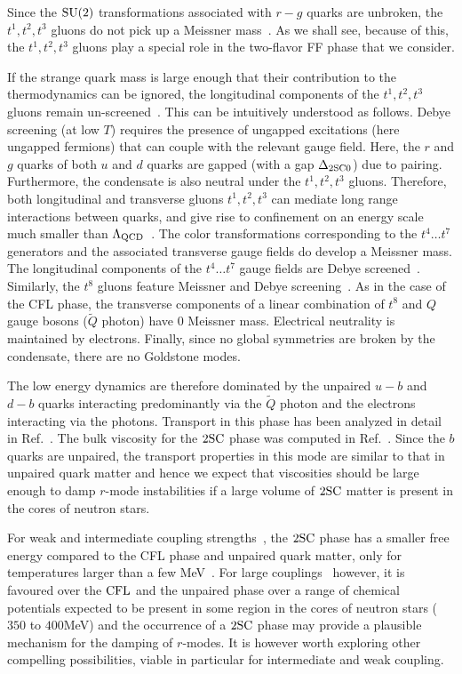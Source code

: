 \documentclass[10pt, aps, prd, superscriptaddress, nofootinbib, 
               amsmath, amssymb, twocolumn,
               preprintnumbers, showpacs,
               raggedbottom,
               floatfix]{revtex4-1}
\newcommand{\SU}{{\rm{SU}}}
\newcommand{\CFL}{{\rm{CFL}}}
\newcommand{\SC}{{\rm{SC}}}
\begin{document}
Since the $\SU(2)$ transformations associated with $r-g$ quarks are unbroken,
the $t^1, t^2, t^3$ gluons do not pick up a Meissner
mass~\cite{Alford:1999pb,Rischke:2000qz}. As we shall see, because of this, the
$t^1, t^2, t^3$ gluons play a special role in the two-flavor FF phase that we
consider.

If the strange quark mass is large enough that their contribution to the
thermodynamics can be ignored, the longitudinal components of the $t^1, t^2,
t^3$ gluons remain un-screened~\cite{Rischke:2000qz,Rischke:2002rz}. This can
be intuitively understood as follows. Debye screening (at low $T$) requires the presence of
ungapped excitations (here ungapped fermions) that can couple with the relevant
gauge field. Here, the $r$ and $g$ quarks of both $u$ and $d$ quarks are gapped
(with a gap $\Delta_{\rm{2SC}0}$) due to pairing. Furthermore, the condensate is
also neutral under the $t^1, t^2, t^3$ gluons. Therefore, both longitudinal and
transverse gluons $t^1, t^2, t^3$ can mediate long range interactions between
quarks, and give rise to confinement on an energy scale much smaller than
$\Lambda_{\rm{QCD}}$~\cite{Rischke:2000cn}. The color transformations
corresponding to the $t^4\dots t^7$ generators and the associated transverse
gauge fields do develop a Meissner mass. The longitudinal components of the
$t^4\dots t^7$ gauge fields are Debye
screened~\cite{Rischke:2000qz,Rischke:2002rz}. Similarly, the $t^8$ gluons
feature Meissner and Debye screening~\cite{Rischke:2000qz,Rischke:2002rz}. As
in the case of the CFL phase, the transverse components of a linear combination
of $t^8$ and $Q$ gauge bosons ($\tilde{Q}$ photon) have $0$ Meissner mass.
Electrical neutrality is maintained by electrons. Finally, since no global
symmetries are broken by the condensate, there are no Goldstone modes. 

The low energy dynamics are therefore dominated by the unpaired $u-b$ and $d-b$
quarks interacting predominantly via the $\tilde{Q}$ photon and the electrons
interacting via the photons. Transport in this phase has been analyzed in
detail in Ref.~\cite{Alford:2014doa}. The bulk viscosity for the $2\SC$ phase
was computed in Ref.~\cite{Alford:2006gy}.  Since the $b$ quarks are
unpaired, the transport properties in this mode are similar to that in unpaired
quark matter and hence we expect that viscosities should be large enough to damp
$r$-mode instabilities if a large volume of $2\SC$ matter is present in the cores
of neutron stars.

For weak and intermediate coupling
strengths~\cite{Abuki:2005ms,Ruester:2005jc}, the $2\SC$ phase has a smaller
free energy compared to the CFL phase and unpaired quark matter, only for
temperatures larger than a few
MeV~\cite{Alford:2002kj,Steiner:2002gx,Abuki:2005ms,Ruester:2005jc}. For large
couplings~\cite{Abuki:2005ms,Ruester:2005jc} however, it is favoured over the
$\CFL$ and the unpaired phase over a range of chemical potentials expected to
be present in some region in the cores of neutron stars ($350$ to $400$MeV) and
the occurrence of a $2\SC$ phase may provide a plausible mechanism for the
damping of $r$-modes. It is however worth exploring other compelling
possibilities, viable in particular for intermediate and weak coupling.
\end{document}
